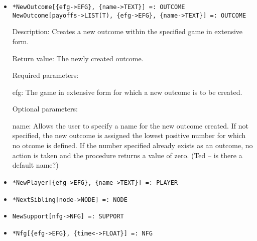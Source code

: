 \begin{itemize}
[type:] Specifies the type (Float or Rational) of the new normal form
game.  This parameter defaults to \verb+Float+.
\ed
\ed

\item
\protect \large \begin{verbatim} 
*NewOutcome[{efg->EFG}, {name->TEXT}] =: OUTCOME
NewOutcome[payoffs->LIST(T), {efg->EFG}, {name->TEXT}] =: OUTCOME
\end{verbatim}\normalsize

\bd
\item
[Description:] Creates a new outcome within the specified game in
extensive form. 
\item
[Return value:] The newly created outcome. 
\item 
[Required parameters:]\hfil\null

\bd
\item
[efg:] The game in extensive form for which a new outcome is to be
created.
\ed

\item
[Optional parameters:]\hfil\null

\bd
\item
[name:] Allows the user to specify a name for the new outcome
created.  If not specified, the new outcome is assigned the lowest
positive number for which no otcome is defined.  If the number
specified already exists as an outcome, no action is taken and the
procedure returns a value of zero.  (Ted -- is there a default name?)
\ed
\ed

\item
\protect \large \begin{verbatim}
*NewPlayer[{efg->EFG}, {name->TEXT}] =: PLAYER 
\end{verbatim}\normalsize

\item
\protect \large \begin{verbatim}
*NextSibling[node->NODE] =: NODE
\end{verbatim}\normalsize

\item
\protect \large \begin{verbatim}
NewSupport[nfg->NFG] =: SUPPORT
\end{verbatim}\normalsize

\item
\protect \large \begin{verbatim}
*Nfg[{efg->EFG}, {time<->FLOAT}] =: NFG
\end{verbatim}\normalsize


\end{itemize}
